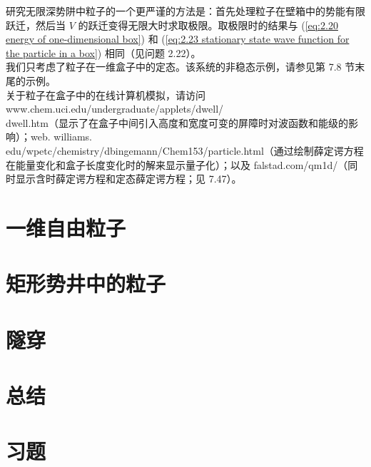 	\indent 研究无限深势阱中粒子的一个更严谨的方法是：首先处理粒子在壁箱中的势能有限跃迁，然后当 $V$ 的跃迁变得无限大时求取极限。取极限时的结果与 (\ref{eq:2.20 energy of one-dimensional box}) 和 (\ref{eq:2.23 stationary state wave function for the particle in a box}) 相同（见问题 2.22）。\\
	\indent 我们只考虑了粒子在一维盒子中的定态。该系统的非稳态示例，请参见第 7.8 节末尾的示例。\\
	\indent 关于粒子在盒子中的在线计算机模拟，请访问 www.chem.uci.edu/undergraduate/applets/dwell/\\dwell.htm（显示了在盒子中间引入高度和宽度可变的屏障时对波函数和能级的影响）；web. williams.\\edu/wpetc/chemistry/dbingemann/Chem153/particle.html（通过绘制薛定谔方程在能量变化和盒子长度变化时的解来显示量子化）；以及 falstad.com/qm1d/（同时显示含时薛定谔方程和定态薛定谔方程；见 7.47）。






\section{一维自由粒子}

\section{矩形势井中的粒子}

\section{隧穿}

\section*{总结}

\section*{习题}

